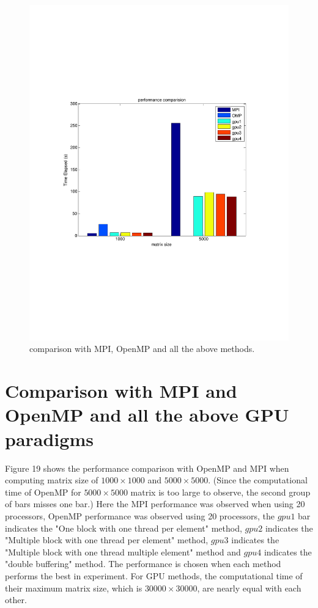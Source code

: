\documentclass {article}
\begin{document}
\begin{figure}[hbp!]
\centering
\includegraphics[width = \linewidth]{comp.pdf}
\caption{comparison with MPI, OpenMP and all the above methods.}
\label{fig:comp}
\end{figure}

\section{Comparison with MPI and OpenMP and all the above GPU paradigms}
Figure 19 shows the performance comparison with OpenMP and MPI when computing matrix size of $1000 \times 1000$ and $5000 \times 5000$. (Since the computational time of OpenMP for $5000 \times 5000$ matrix is too large to observe, the second group of bars misses one bar.) Here the MPI performance was observed when using 20 processors, OpenMP performance was observed using 20 processors, the $gpu1$ bar indicates the "One block with one thread per element" method, $gpu2$ indicates the "Multiple block with one thread per element" method, $gpu3$ indicates the "Multiple block with one thread multiple element" method and $gpu4$ indicates the "double buffering" method. The performance is chosen when each method performs the best in experiment. For GPU methods, the computational time of their maximum matrix size, which is $30000\times 30000$, are nearly equal with each other. 
\end{document}
